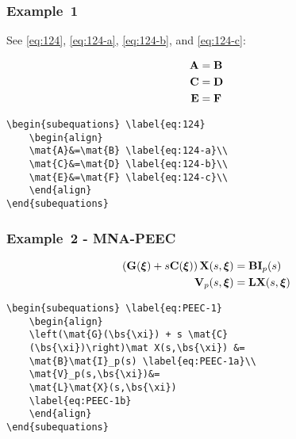 \documentclass[journal]{IEEEtran}
\begin{document}
\subsubsection{Example~1}
See \eqref{eq:124}, \eqref{eq:124-a}, \eqref{eq:124-b}, and \eqref{eq:124-c}:

\begin{subequations} \label{eq:124}
\begin{align}
\mathbf{A}&=\mathbf{B} \label{eq:124-a}\\
\mathbf{C}&=\mathbf{D} \label{eq:124-b}\\
\mathbf{E}&=\mathbf{F} \label{eq:124-c}\\
\end{align}
\end{subequations}


\begin{verbatim}
\begin{subequations} \label{eq:124}
	\begin{align}
	\mat{A}&=\mat{B} \label{eq:124-a}\\
	\mat{C}&=\mat{D} \label{eq:124-b}\\
	\mat{E}&=\mat{F} \label{eq:124-c}\\
	\end{align}
\end{subequations}
\end{verbatim}

\subsubsection{Example~2 - MNA-PEEC}
\begin{subequations} \label{eq:PEEC-1}
	\begin{align}
	\left(\mathbf{G}(\mbox{$\boldsymbol{\xi}$}) + s \mathbf{C}(\mbox{$\boldsymbol{\xi}$})\right)\mathbf{X}(s,\mbox{$\boldsymbol{\xi}$}) &=
	\mathbf{B}\mathbf{I}_p(s) \label{eq:PEEC-1a}\\
	\mathbf{V}_p(s,\mbox{$\boldsymbol{\xi}$})&=
	\mathbf{L}\mathbf{X}(s,\mbox{$\boldsymbol{\xi}$}) \label{eq:PEEC-1b}
	\end{align}
\end{subequations}

\begin{verbatim}
\begin{subequations} \label{eq:PEEC-1}
	\begin{align}
	\left(\mat{G}(\bs{\xi}) + s \mat{C}
	(\bs{\xi})\right)\mat X(s,\bs{\xi}) &=
	\mat{B}\mat{I}_p(s) \label{eq:PEEC-1a}\\
	\mat{V}_p(s,\bs{\xi})&=
	\mat{L}\mat{X}(s,\bs{\xi}) 
	\label{eq:PEEC-1b}
	\end{align}
\end{subequations}
\end{verbatim}
\end{document}
